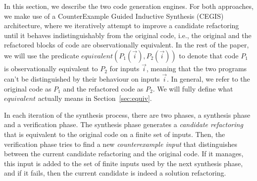 \documentclass[sigconf]{acmart}
\begin{document}



In this section, we describe the two code generation engines.
For both approaches, we make use of a CounterExample Guided Inductive Synthesis (CEGIS)~\cite{DBLP:conf/pldi/Solar-LezamaJB08} architecture, where we
iteratively attempt to improve a candidate refactoring
until it behaves indistinguishably
from the original code, i.e., the original and
the refactored blocks of code are observationally equivalent.
%
In the rest of the paper, we will use the predicate
$equivalent(P_1(\vec{i}), P_2(\vec{i}))$ to denote that code $P_1$ is
observationally equivalent to $P_2$ for inputs $\vec{i}$, meaning that the two programs
can't be distinguished by their behaviour on inputs $\vec{i}$.  In general,
we refer to the original code as $P_1$ and the refactored code as
$P_2$. We will fully define what $equivalent$ actually means in Section~\ref{sec:equiv}.

In each iteration of the synthesis process, there are two phases, a synthesis phase and a verification phase. The synthesis phase generates a {\em candidate refactoring} that is equivalent to
the original code on a finite set of inputs. Then, the verification phase tries to find a new {\em counterexample input} that distinguishes between the current candidate refactoring and the original code. If it manages, this input is added to the set of finite inputs used by the next synthesis phase, and if it fails, then the current candidate is indeed a solution refactoring.
\end{document}
